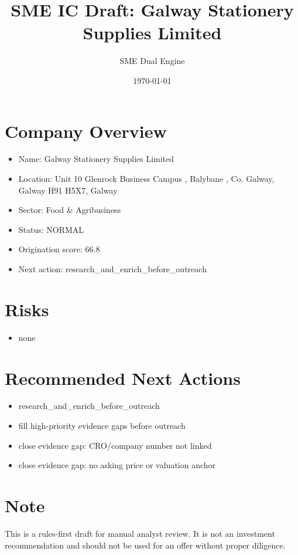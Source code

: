 \documentclass[11pt,a4paper]{article}
\title{SME IC Draft: Galway Stationery Supplies Limited}
\author{SME Dual Engine}
\date{\today}
\begin{document}
\maketitle
\section*{Company Overview}
\begin{itemize}[leftmargin=1.4em]
\item Name: Galway Stationery Supplies Limited
\item Location: Unit 10 Glenrock Business Campus , Balybane , Co. Galway, Galway H91 H5X7, Galway
\item Sector: Food \& Agribusiness
\item Status: NORMAL
\item Origination score: 66.8
\item Next action: research\_and\_enrich\_before\_outreach
\end{itemize}
\section*{Risks}
\begin{itemize}[leftmargin=1.4em]
\item none
\end{itemize}
\section*{Recommended Next Actions}
\begin{itemize}[leftmargin=1.4em]
\item research\_and\_enrich\_before\_outreach
\item fill high-priority evidence gaps before outreach
\item close evidence gap: CRO/company number not linked
\item close evidence gap: no asking price or valuation anchor
\end{itemize}
\section*{Note}
This is a rules-first draft for manual analyst review. It is not an investment
recommendation and should not be used for an offer without proper diligence.
\end{document}
